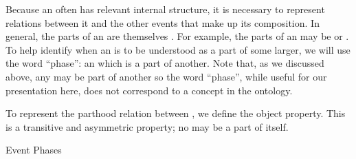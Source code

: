 Because an  often has relevant internal structure, it is necessary to represent relations between it and the other events that make up its composition. In general, the parts of an  are themselves . For example, the parts of an  may be  or . To help identify when an  is to be understood as a part of some larger, we will use the word ``phase'': an  which is a part of another. Note that, as we discussed above, any  may be part of another so the word ``phase'', while useful for our presentation here, does not correspond to a concept in the ontology.
%
%
%

To represent the parthood relation between , we define the  object property. This is a transitive and asymmetric property; no  may be a part of itself.

\begin{ODP}{Event Phases}
\end{ODP}

